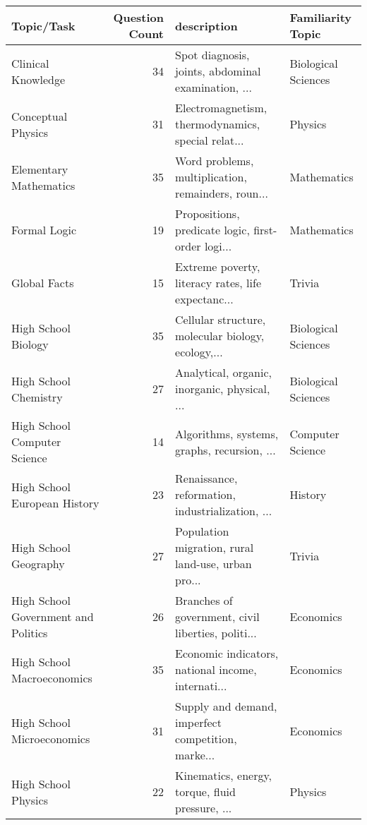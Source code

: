 \begin{tabular}{lrll}
\toprule
                         Topic/Task &  Question Count &                                        description &   Familiarity Topic \\
\midrule
                 Clinical Knowledge &              34 & Spot diagnosis, joints, abdominal examination, ... & Biological Sciences \\
                 Conceptual Physics &              31 & Electromagnetism, thermodynamics, special relat... &             Physics \\
             Elementary Mathematics &              35 & Word problems, multiplication, remainders, roun... &         Mathematics \\
                       Formal Logic &              19 & Propositions, predicate logic, first-order logi... &         Mathematics \\
                       Global Facts &              15 & Extreme poverty, literacy rates, life expectanc... &              Trivia \\
                High School Biology &              35 & Cellular structure, molecular biology, ecology,... & Biological Sciences \\
              High School Chemistry &              27 &      Analytical, organic, inorganic, physical, ... & Biological Sciences \\
       High School Computer Science &              14 &        Algorithms, systems, graphs, recursion, ... &    Computer Science \\
       High School European History &              23 &   Renaissance, reformation, industrialization, ... &             History \\
              High School Geography &              27 & Population migration, rural land-use, urban pro... &              Trivia \\
High School Government and Politics &              26 & Branches of government, civil liberties, politi... &           Economics \\
         High School Macroeconomics &              35 & Economic indicators, national income, internati... &           Economics \\
         High School Microeconomics &              31 & Supply and demand, imperfect competition, marke... &           Economics \\
                High School Physics &              22 &    Kinematics, energy, torque, fluid pressure, ... &             Physics \\

\end{tabular}
